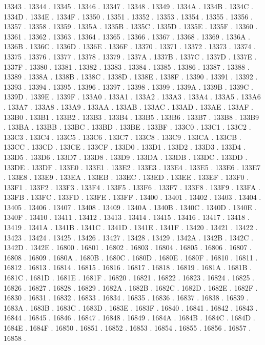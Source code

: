 13343 .
13344 .
13345 .
13346 .
13347 .
13348 .
13349 .
1334A .
1334B .
1334C .
1334D .
1334E .
1334F .
13350 .
13351 .
13352 .
13353 .
13354 .
13355 .
13356 .
13357 .
13358 .
13359 .
1335A .
1335B .
1335C .
1335D .
1335E .
1335F .
13360 .
13361 .
13362 .
13363 .
13364 .
13365 .
13366 .
13367 .
13368 .
13369 .
1336A .
1336B .
1336C .
1336D .
1336E .
1336F .
13370 .
13371 .
13372 .
13373 .
13374 .
13375 .
13376 .
13377 .
13378 .
13379 .
1337A .
1337B .
1337C .
1337D .
1337E .
1337F .
13380 .
13381 .
13382 .
13383 .
13384 .
13385 .
13386 .
13387 .
13388 .
13389 .
1338A .
1338B .
1338C .
1338D .
1338E .
1338F .
13390 .
13391 .
13392 .
13393 .
13394 .
13395 .
13396 .
13397 .
13398 .
13399 .
1339A .
1339B .
1339C .
1339D .
1339E .
1339F .
133A0 .
133A1 .
133A2 .
133A3 .
133A4 .
133A5 .
133A6 .
133A7 .
133A8 .
133A9 .
133AA .
133AB .
133AC .
133AD .
133AE .
133AF .
133B0 .
133B1 .
133B2 .
133B3 .
133B4 .
133B5 .
133B6 .
133B7 .
133B8 .
133B9 .
133BA .
133BB .
133BC .
133BD .
133BE .
133BF .
133C0 .
133C1 .
133C2 .
133C3 .
133C4 .
133C5 .
133C6 .
133C7 .
133C8 .
133C9 .
133CA .
133CB .
133CC .
133CD .
133CE .
133CF .
133D0 .
133D1 .
133D2 .
133D3 .
133D4 .
133D5 .
133D6 .
133D7 .
133D8 .
133D9 .
133DA .
133DB .
133DC .
133DD .
133DE .
133DF .
133E0 .
133E1 .
133E2 .
133E3 .
133E4 .
133E5 .
133E6 .
133E7 .
133E8 .
133E9 .
133EA .
133EB .
133EC .
133ED .
133EE .
133EF .
133F0 .
133F1 .
133F2 .
133F3 .
133F4 .
133F5 .
133F6 .
133F7 .
133F8 .
133F9 .
133FA .
133FB .
133FC .
133FD .
133FE .
133FF .
13400 .
13401 .
13402 .
13403 .
13404 .
13405 .
13406 .
13407 .
13408 .
13409 .
1340A .
1340B .
1340C .
1340D .
1340E .
1340F .
13410 .
13411 .
13412 .
13413 .
13414 .
13415 .
13416 .
13417 .
13418 .
13419 .
1341A .
1341B .
1341C .
1341D .
1341E .
1341F .
13420 .
13421 .
13422 .
13423 .
13424 .
13425 .
13426 .
13427 .
13428 .
13429 .
1342A .
1342B .
1342C .
1342D .
1342E .
16800 .
16801 .
16802 .
16803 .
16804 .
16805 .
16806 .
16807 .
16808 .
16809 .
1680A .
1680B .
1680C .
1680D .
1680E .
1680F .
16810 .
16811 .
16812 .
16813 .
16814 .
16815 .
16816 .
16817 .
16818 .
16819 .
1681A .
1681B .
1681C .
1681D .
1681E .
1681F .
16820 .
16821 .
16822 .
16823 .
16824 .
16825 .
16826 .
16827 .
16828 .
16829 .
1682A .
1682B .
1682C .
1682D .
1682E .
1682F .
16830 .
16831 .
16832 .
16833 .
16834 .
16835 .
16836 .
16837 .
16838 .
16839 .
1683A .
1683B .
1683C .
1683D .
1683E .
1683F .
16840 .
16841 .
16842 .
16843 .
16844 .
16845 .
16846 .
16847 .
16848 .
16849 .
1684A .
1684B .
1684C .
1684D .
1684E .
1684F .
16850 .
16851 .
16852 .
16853 .
16854 .
16855 .
16856 .
16857 .
16858 .
